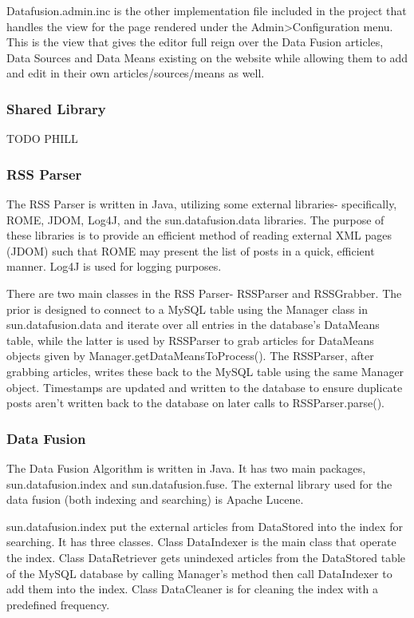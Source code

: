 \documentclass[11pt]{article} %
\begin{document}
Datafusion.admin.inc is the other implementation file included in the project that handles the view for the page rendered under the Admin>Configuration menu. This is the view that gives the editor full reign over the Data Fusion articles, Data Sources and Data Means existing on the website while allowing them to add and edit in their own articles/sources/means as well.

\subsubsection{Shared Library}

TODO PHILL

\subsubsection{RSS Parser}

The RSS Parser is written in Java, utilizing some external libraries- specifically, ROME, JDOM, Log4J, and the sun.datafusion.data libraries. The purpose of these libraries is to provide an efficient method of reading external XML pages (JDOM) such that ROME may present the list of posts in a quick, efficient manner. Log4J is used for logging purposes.

There are two main classes in the RSS Parser- RSSParser and RSSGrabber. The prior is designed to connect to a MySQL table using the Manager class in sun.datafusion.data and iterate over all entries in the database’s DataMeans table, while the latter is used by RSSParser to grab articles for DataMeans objects given by Manager.getDataMeansToProcess(). The RSSParser, after grabbing articles, writes these back to the MySQL table using the same Manager object. Timestamps are updated and written to the database to ensure duplicate posts aren’t written back to the database on later calls to RSSParser.parse().

\subsubsection{Data Fusion}

The Data Fusion Algorithm is written in Java. It has two main packages, sun.datafusion.index and sun.datafusion.fuse. The external library used for the data fusion (both indexing and searching) is Apache Lucene.

sun.datafusion.index put the external articles from DataStored into the index for searching. It has three classes. Class DataIndexer is the main class that operate the index. Class DataRetriever gets unindexed articles from the DataStored table of the MySQL database by calling Manager’s method then call DataIndexer to add them into the index. Class DataCleaner is for cleaning the index with a predefined frequency.
\end{document}
